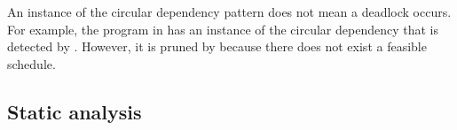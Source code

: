 \examplefigfour

An instance of the circular dependency pattern does not mean a deadlock occurs. For example, the program in  has an instance of the circular dependency that is detected by . However, it is pruned by  because there does not exist a feasible schedule.

\subsection{Static analysis}


\begin{figure*}[tb]
\centering
{}
\end{figure*}

